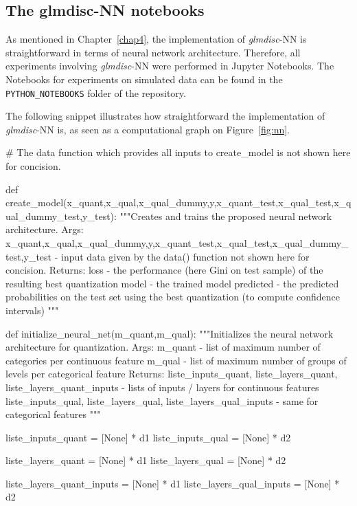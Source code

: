 \subsection{The glmdisc-NN notebooks} \label{app2:nn}

As mentioned in Chapter~\ref{chap4}, the implementation of \textit{glmdisc}-NN is straightforward in terms of neural network architecture. Therefore, all experiments involving \textit{glmdisc}-NN were performed in Jupyter Notebooks. The Notebooks for experiments on simulated data can be found in the \verb|PYTHON_NOTEBOOKS| folder of the repository.

The following snippet illustrates how straightforward the implementation of \textit{glmdisc}-NN is, as seen as a computational graph on Figure~\ref{fig:nn}.

\begin{pylisting}
# The data function which provides all inputs to create_model is not shown here for concision.

def create_model(x_quant,x_qual,x_qual_dummy,y,x_quant_test,x_qual_test,x_qual_dummy_test,y_test):
    """Creates and trains the proposed neural network architecture.
    Args:
       x_quant,x_qual,x_qual_dummy,y,x_quant_test,x_qual_test,x_qual_dummy_test,y_test - input data given by the data() function not shown here for concision.
    Returns:
       loss - the performance (here Gini on test sample) of the resulting best quantization
       model - the trained model
       predicted - the predicted probabilities on the test set using the best quantization (to compute confidence intervals)
    """
    
    def initialize_neural_net(m_quant,m_qual):
        """Initializes the neural network architecture for quantization.
	    Args:
	       m_quant - list of maximum number of categories per continuous feature
	       m_qual - list of maximum number of groups of levels per categorical feature
	    Returns:
            liste_inputs_quant, liste_layers_quant, liste_layers_quant_inputs - lists of inputs / layers for continuous features
            liste_inputs_qual, liste_layers_qual, liste_layers_qual_inputs - same for categorical features
	    """
	    
        liste_inputs_quant = [None] * d1
        liste_inputs_qual = [None] * d2

        liste_layers_quant = [None] * d1
        liste_layers_qual = [None] * d2

        liste_layers_quant_inputs = [None] * d1
        liste_layers_qual_inputs = [None] * d2


\end{pylisting}
